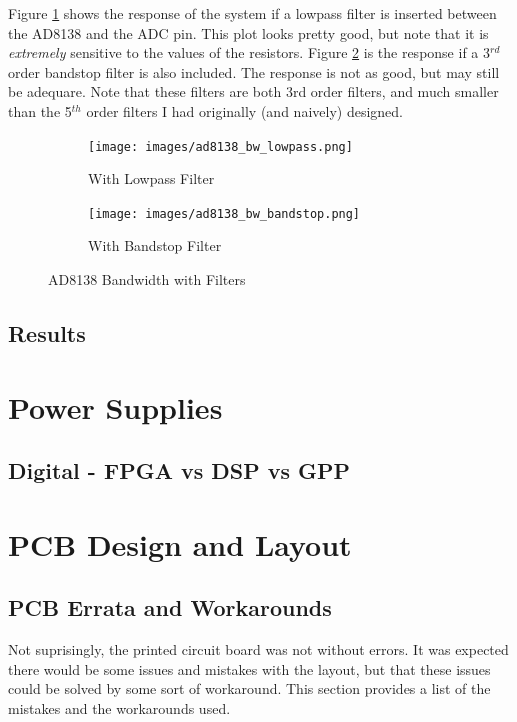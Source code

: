 \documentclass[a4paper, 12pt, notitlepage]{article}
\begin{document}
Figure \ref{fig:ad8138_bw_lowpass} shows the response of the system if a lowpass filter is inserted between the AD8138 and the ADC pin.  This plot looks pretty good, but note that it is \textit{extremely} sensitive to the values of the resistors.  Figure \ref{fig:ad8138_bw_bandstop} is the response if a 3$^{rd}$ order bandstop filter is also included.  The response is not as good, but may still be adequare.  Note that these filters are both 3rd order filters, and much smaller than the 5$^{th}$ order filters I had originally (and naively) designed.

\begin{figure}[ht]
\centering
\begin{subfigure}[b]{0.45\textwidth}
  \texttt{[image: images/ad8138\_bw\_lowpass.png]}
  \caption{With Lowpass Filter}
  \label{fig:ad8138_bw_lowpass}
\end{subfigure}
\begin{subfigure}[b]{0.45\textwidth}
  \texttt{[image: images/ad8138\_bw\_bandstop.png]}
  \caption{With Bandstop Filter}
  \label{fig:ad8138_bw_bandstop}
\end{subfigure}

\caption{AD8138 Bandwidth with Filters}
\label{fig:ad8138_bw_filters}
\end{figure}

\subsection{Results}

\section{Power Supplies}

\subsection{Digital - FPGA vs DSP vs GPP}

\section{PCB Design and Layout}
\subsection{PCB Errata and Workarounds}
Not suprisingly, the printed circuit board was not without errors.  It was expected there would be some issues and mistakes with the layout, but that these issues could be solved by some sort of workaround.  This section provides a list of the mistakes and the workarounds used.
\end{document}
